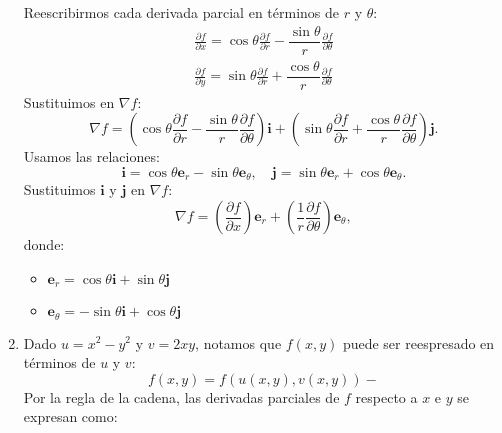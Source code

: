 \begin{enumerate}[label=\color{red}\textbf{\arabic*)}]
\[  \] 
  Reescribirmos cada derivada parcial en términos de $r $ y $\theta$: \[
  \begin{array}{l}
    \frac{\partial f}{\partial x} =\cos\theta \frac{\partial f}{\partial r} -\dfrac{\sin\theta}{r}\frac{\partial f}{\partial \theta}\\
    \frac{\partial f}{\partial y} =\sin\theta \frac{\partial f}{\partial r} +\dfrac{\cos\theta}{r}\frac{\partial f}{\partial \theta} 
  \end{array}
  \] 
  Sustituimos en $\nabla f:$ \[
  \nabla f=\left( \cos\theta \frac{\partial f}{\partial r} -\dfrac{\sin\theta}{r}\frac{\partial f}{\partial \theta}  \right) \mathbf{i} +\left( \sin\theta \frac{\partial f}{\partial r}+\dfrac{\cos\theta}{r}\frac{\partial f}{\partial \theta}   \right) \mathbf{j} .
  \] 
  Usamos las relaciones: \[
  \mathbf{i} =\cos\theta\mathbf{e}_r -\sin\theta\mathbf{e} _\theta,\quad \mathbf{j} =\sin\theta\mathbf{e} _r+\cos\theta\mathbf{e} _\theta.
  \] 
  Sustituimos $\mathbf{i} $ y $\mathbf{j} $ en $\nabla f$: \[
  \nabla f=\left( \frac{\partial f}{\partial x}  \right) \mathbf{e} _r+\left( \dfrac{1}{r}\frac{\partial f}{\partial \theta}  \right) \mathbf{e} _\theta,
  \] donde:
  \begin{itemize}[label=\textbullet]
    \item $\mathbf{e} _r=\cos\theta\mathbf{i} +\sin\theta\mathbf{j} $
    \item $\mathbf{e} _\theta=-\sin\theta\mathbf{i} +\cos\theta\mathbf{j} $
  \end{itemize}
\item {} 

Dado $u=x^2-y^2$ y $v=2xy$, notamos que  $f(x,y)$ puede ser reespresado en términos de  $u$ y  $v$:  \[
f(x,y)=f(u(x,y), v(x,y))-
\] 
Por la regla de la cadena, las derivadas parciales de $f$ respecto a  $x$ e  $y$ se expresan como:


\end{enumerate}
